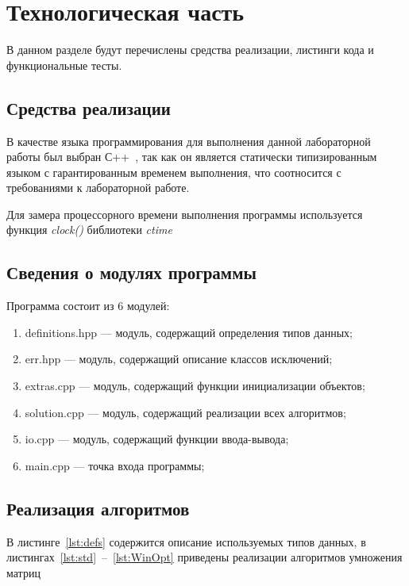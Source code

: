 \chapter{Технологическая часть}

В данном разделе будут перечислены средства реализации, листинги кода
и функциональные тесты.

\section{Средства реализации}

В качестве языка программирования для выполнения данной лабораторной работы был выбран С++~\cite{book:cpp}, так как он является статически типизированным языком с гарантированным временем выполнения, что соотносится с требованиями к лабораторной работе.

Для замера процессорного времени выполнения программы используется функция \textit{clock()} библиотеки \textit{ctime}~\cite{book:ctime_sync}~\cite{book:time_clock}

\section{Сведения о модулях программы}

Программа состоит из 6 модулей:

\begin{enumerate}[label={\arabic*)}]
	\item definitions.hpp --- модуль, содержащий определения типов данных;
	\item err.hpp --- модуль, содержащий описание классов исключений;
	\item extras.cpp --- модуль, содержащий функции инициализации объектов;
	\item solution.cpp --- модуль, содержащий реализации всех алгоритмов;
	\item io.cpp --- модуль, содержащий функции ввода-вывода;
	\item main.cpp --- точка входа программы;
\end{enumerate}

\section{Реализация алгоритмов}

В листинге~\ref{lst:defs} содержится описание используемых типов данных, в листингах~\ref{lst:std}~--~\ref{lst:WinOpt} приведены реализации алгоритмов умножения матриц

